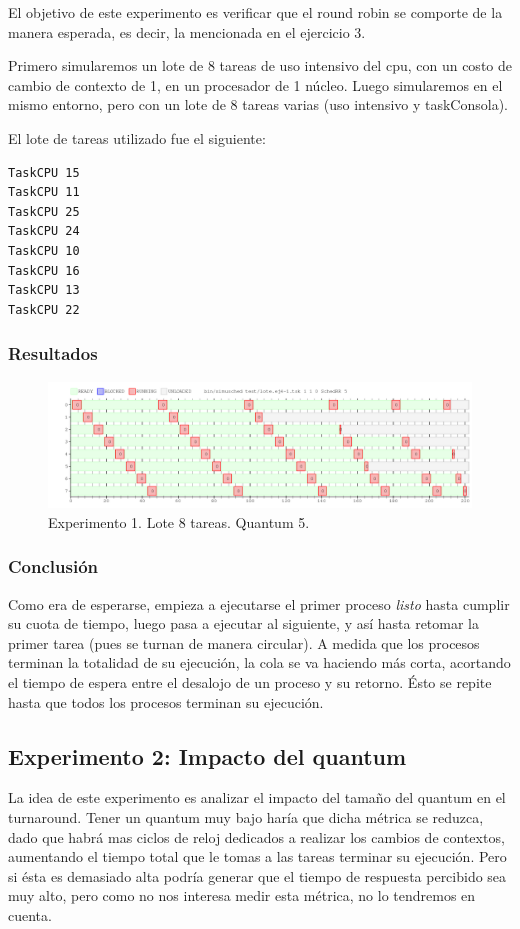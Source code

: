 \documentclass[a4paper]{article}
\begin{document}
El objetivo de este experimento es verificar que el round robin se comporte
de la manera esperada, es decir, la mencionada en el ejercicio 3.

Primero simularemos un lote de 8 tareas de uso intensivo del cpu, con un
costo de cambio de contexto de 1, en un procesador de 1 núcleo. Luego
simularemos en el mismo entorno, pero con un lote de 8 tareas varias (uso
intensivo y  taskConsola).

El lote de tareas utilizado fue el siguiente:

\begin{verbatim}
TaskCPU 15
TaskCPU 11
TaskCPU 25
TaskCPU 24
TaskCPU 10
TaskCPU 16
TaskCPU 13
TaskCPU 22
\end{verbatim}

\subsubsection{Resultados}
\begin{figure}[htb]
\begin{center}
\includegraphics[scale=0.4]{imagenes/ej4-1.png}
\end{center}
\caption{Experimento 1. Lote 8 tareas. Quantum 5.}
\end{figure}

\subsubsection{Conclusión}
Como era de esperarse, empieza a ejecutarse el primer proceso \textit{listo}
hasta cumplir su cuota de tiempo, luego pasa a ejecutar al siguiente, y así
hasta retomar la primer tarea (pues se turnan de manera circular). A medida
que los procesos terminan la totalidad de su ejecución, la cola se va haciendo más corta,
acortando el tiempo de espera entre el desalojo de un proceso y su retorno.
Ésto se repite hasta que todos los procesos terminan su ejecución.

\subsection{Experimento 2: Impacto del quantum}
La idea de este experimento es analizar el impacto del tamaño del quantum en el turnaround. Tener un quantum muy bajo haría que dicha métrica se reduzca,
dado que habrá mas ciclos de reloj dedicados a realizar los cambios de
contextos, aumentando el tiempo total que le tomas a las tareas terminar su
ejecución. Pero si ésta es demasiado alta podría generar que el tiempo de
respuesta percibido sea muy alto, pero como no nos interesa medir esta
métrica, no lo tendremos en cuenta.
\end{document}
